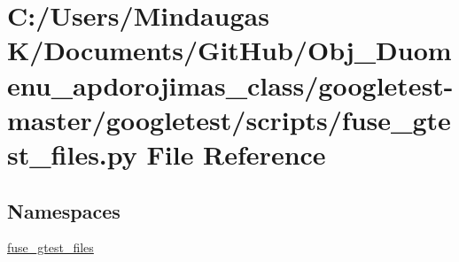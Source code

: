 \hypertarget{googletest-master_2googletest_2scripts_2fuse__gtest__files_8py}{}\section{C\+:/\+Users/\+Mindaugas K/\+Documents/\+Git\+Hub/\+Obj\+\_\+\+Duomenu\+\_\+apdorojimas\+\_\+class/googletest-\/master/googletest/scripts/fuse\+\_\+gtest\+\_\+files.py File Reference}
\label{googletest-master_2googletest_2scripts_2fuse__gtest__files_8py}
\subsection*{Namespaces}
\begin{DoxyCompactItemize}
\item 
 \mbox{\hyperlink{namespacefuse__gtest__files}{fuse\+\_\+gtest\+\_\+files}}
\end{DoxyCompactItemize}
